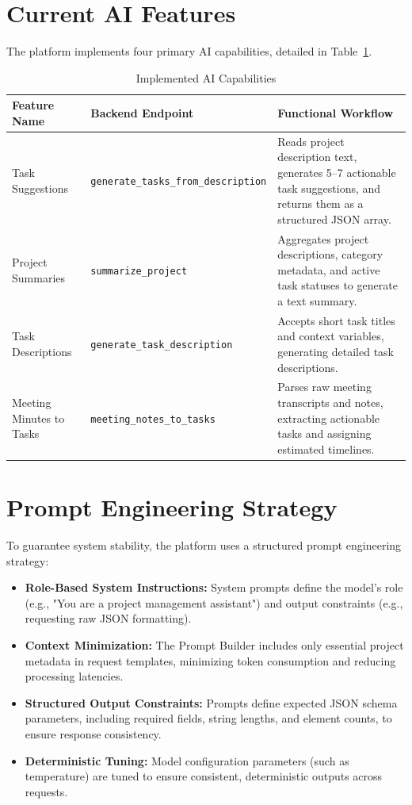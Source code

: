 \section{Current AI Features}
The platform implements four primary AI capabilities, detailed in Table~\ref{tab:implemented_ai_features}.

\begin{table}[h!]
\centering
\small
\renewcommand{\arraystretch}{1.4}
\begin{tabularx}{\textwidth}{l p{3.2cm} X}
    \toprule[1.5pt]
    \rowcolor{primary!5}
    \textbf{\color{primary}Feature Name} & \textbf{\color{primary}Backend Endpoint} & \textbf{\color{primary}Functional Workflow} \\
    \midrule
    Task Suggestions & \texttt{generate\_tasks\_from\_description} & Reads project description text, generates 5--7 actionable task suggestions, and returns them as a structured JSON array. \\
    Project Summaries & \texttt{summarize\_project} & Aggregates project descriptions, category metadata, and active task statuses to generate a text summary. \\
    Task Descriptions & \texttt{generate\_task\_description} & Accepts short task titles and context variables, generating detailed task descriptions. \\
    Meeting Minutes to Tasks & \texttt{meeting\_notes\_to\_tasks} & Parses raw meeting transcripts and notes, extracting actionable tasks and assigning estimated timelines. \\
    \bottomrule[1.5pt]
\end{tabularx}
\caption{Implemented AI Capabilities}
\label{tab:implemented_ai_features}
\end{table}

\section{Prompt Engineering Strategy}
To guarantee system stability, the platform uses a structured prompt engineering strategy:
\begin{itemize}
    \item \textbf{Role-Based System Instructions:} System prompts define the model's role (e.g., "You are a project management assistant") and output constraints (e.g., requesting raw JSON formatting).
    \item \textbf{Context Minimization:} The Prompt Builder includes only essential project metadata in request templates, minimizing token consumption and reducing processing latencies.
    \item \textbf{Structured Output Constraints:} Prompts define expected JSON schema parameters, including required fields, string lengths, and element counts, to ensure response consistency.
    \item \textbf{Deterministic Tuning:} Model configuration parameters (such as temperature) are tuned to ensure consistent, deterministic outputs across requests.
\end{itemize}

